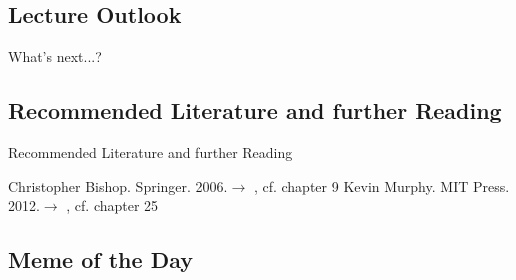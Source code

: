 \subsection{Lecture Outlook}

\begin{frame}{What's next...?}{}
\end{frame}


\subsection{Recommended Literature and further Reading}

\begin{frame}{Recommended Literature and further Reading}{}
	\footnotesize
	\begin{thebibliography}{2}
			{Christopher Bishop. Springer. 2006.}{$\rightarrow$ \href{
				http://users.isr.ist.utl.pt/~wurmd/Livros/school/Bishop\%20-\%20Pattern\%20Recognition\%20And\%20Machine\%20Learning\%20-\%20Springer\%20\%202006.pdf
			}{}, cf. chapter 9}
			{Kevin Murphy. MIT Press. 2012.}{$\rightarrow$ \href{
				https://doc.lagout.org/science/Artificial\%20Intelligence/Machine\%20learning/Machine\%20Learning_\%20A\%20Probabilistic\%20Perspective\%20\%5BMurphy\%202012-08-24\%5D.pdf
			}{}, cf. chapter 25}	
	\end{thebibliography}
\end{frame}


\subsection{Meme of the Day}

